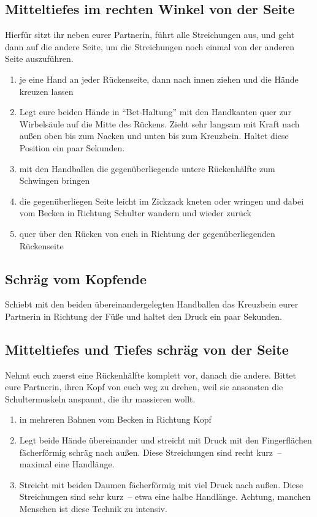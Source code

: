 \subsection{Mitteltiefes im rechten Winkel von der Seite}
Hierfür sitzt ihr neben eurer Partnerin, führt alle Streichungen aus, und geht dann auf die andere Seite, um die Streichungen noch einmal von der anderen Seite auszuführen.

\begin{enumerate}
	\item {} je eine Hand an jeder Rückenseite, dann nach innen ziehen und die Hände kreuzen lassen
	\item {} Legt eure beiden Hände in "`Bet-Haltung"' mit den Handkanten quer zur Wirbelsäule auf die Mitte des Rückens. Zieht sehr langsam mit Kraft nach außen oben bis zum Nacken und unten bis zum Kreuzbein. Haltet diese Position ein paar Sekunden.
	\item {} mit den Handballen die gegenüberliegende untere Rückenhälfte zum Schwingen bringen
	\item {} die gegenüberliegen Seite leicht im Zickzack kneten oder wringen und dabei vom Becken in Richtung Schulter wandern und wieder zurück
	\item {} quer über den Rücken von euch in Richtung der gegenüberliegenden Rückenseite
\end{enumerate}


\subsection{Schräg vom Kopfende}
 Schiebt mit den beiden übereinandergelegten Handballen das Kreuzbein eurer Partnerin in Richtung der Füße und haltet den Druck ein paar Sekunden.


\subsection{Mitteltiefes und Tiefes schräg von der Seite}

Nehmt euch zuerst eine Rückenhälfte komplett vor, danach die andere. Bittet eure Partnerin, ihren Kopf von euch weg zu drehen, weil sie ansonsten die Schultermuskeln anspannt, die ihr massieren wollt.

\begin{enumerate}
	\item {} in mehreren Bahnen vom Becken in Richtung Kopf
	\item {} Legt beide Hände übereinander und streicht mit Druck mit den Fingerflächen fächerförmig schräg nach außen. Diese Streichungen sind recht kurz~-- maximal eine Handlänge.
	\item {} Streicht mit beiden Daumen fächerförmig mit viel Druck nach außen. Diese Streichungen sind sehr kurz~-- etwa eine halbe Handlänge. Achtung, manchen Menschen ist diese Technik zu intensiv.
\end{enumerate}


